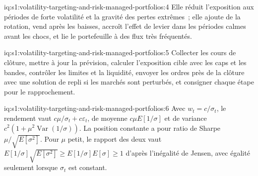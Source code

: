 \begin{solution}{iq:s1:volatility-targeting-and-risk-managed-portfolios:4}
Elle réduit l'exposition aux périodes de forte volatilité et la gravité des pertes extrêmes~; elle ajoute de la rotation, vend après les baisses, accroît l'effet de levier dans les périodes calmes avant
les chocs, et lie le portefeuille à des flux très fréquentés.
\end{solution}

\begin{solution}{iq:s1:volatility-targeting-and-risk-managed-portfolios:5}
Collecter les cours de clôture, mettre à jour la prévision, calculer l'exposition cible avec les caps et les bandes, contrôler les limites et la liquidité, envoyer les ordres près de la clôture
avec une solution de repli si les marchés sont perturbés, et consigner chaque étape pour le rapprochement.
\end{solution}

\begin{solution}{iq:s1:volatility-targeting-and-risk-managed-portfolios:6}
Avec $w_t = c/\sigma_t$, le rendement vaut $c\mu/\sigma_t + c\varepsilon_t$, de moyenne $c\mu E[1/\sigma]$ et de variance $c^2(1 + \mu^2\operatorname{Var}(1/\sigma))$.
La position constante a pour ratio de Sharpe $\mu/\sqrt{E[\sigma^2]}$. Pour $\mu$ petit, le rapport des deux vaut $E[1/\sigma]\sqrt{E[\sigma^2]} \ge E[1/\sigma]E[\sigma]
\ge 1$ d'après l'inégalité de Jensen, avec égalité seulement lorsque $\sigma_t$ est constant.
\end{solution}
